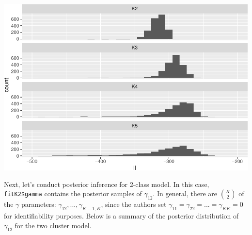 \documentclass[]{article}
\newenvironment{Shaded}{\begin{snugshade}}{\end{snugshade}}
\newcommand{\DataTypeTok}[1]{\textcolor[rgb]{0.13,0.29,0.53}{#1}}
\newcommand{\DecValTok}[1]{\textcolor[rgb]{0.00,0.00,0.81}{#1}}
\newcommand{\KeywordTok}[1]{\textcolor[rgb]{0.13,0.29,0.53}{\textbf{#1}}}
\newcommand{\NormalTok}[1]{#1}
\newcommand{\OperatorTok}[1]{\textcolor[rgb]{0.81,0.36,0.00}{\textbf{#1}}}
\newcommand{\StringTok}[1]{\textcolor[rgb]{0.31,0.60,0.02}{#1}}
\begin{document}
\begin{Shaded}
\end{Shaded}

\includegraphics{karate_test_files/figure-latex/unnamed-chunk-9-1.pdf}

Next, let's conduct posterior inference for 2-class model. In this case,
\texttt{fitK2\$gamma} contains the posterior samples of \(\gamma_{12}\).
In general, there are \(K \choose 2\) of the \(\gamma\) parameters:
\(\gamma_{12},...,\gamma_{K-1,K}\), since the authors set
\(\gamma_{11} = \gamma_{22} = ... = \gamma_{KK} = 0\) for
identifiability purposes. Below is a summary of the posterior
distribution of \(\gamma_{12}\) for the two cluster model.
\end{document}
